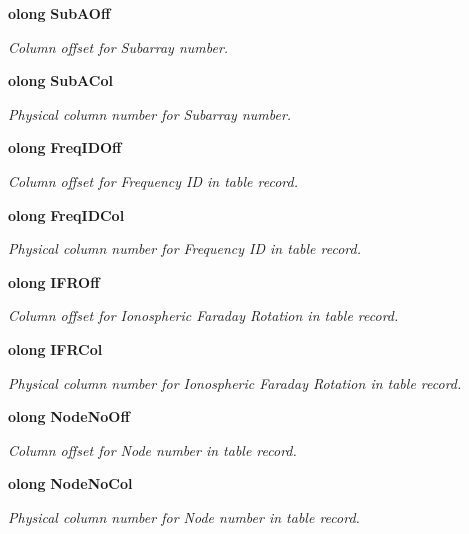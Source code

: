 \begin{CompactItemize}
{\bf olong} {\bf Sub\-AOff}
\begin{CompactList}\small\item\em Column offset for Subarray number. \item\end{CompactList}\item 
{\bf olong} {\bf Sub\-ACol}
\begin{CompactList}\small\item\em Physical column number for Subarray number. \item\end{CompactList}\item 
{\bf olong} {\bf Freq\-IDOff}
\begin{CompactList}\small\item\em Column offset for Frequency ID in table record. \item\end{CompactList}\item 
{\bf olong} {\bf Freq\-IDCol}
\begin{CompactList}\small\item\em Physical column number for Frequency ID in table record. \item\end{CompactList}\item 
{\bf olong} {\bf IFROff}
\begin{CompactList}\small\item\em Column offset for Ionospheric Faraday Rotation in table record. \item\end{CompactList}\item 
{\bf olong} {\bf IFRCol}
\begin{CompactList}\small\item\em Physical column number for Ionospheric Faraday Rotation in table record. \item\end{CompactList}\item 
{\bf olong} {\bf Node\-No\-Off}
\begin{CompactList}\small\item\em Column offset for Node number in table record. \item\end{CompactList}\item 
{\bf olong} {\bf Node\-No\-Col}
\begin{CompactList}\small\item\em Physical column number for Node number in table record. \item\end{CompactList}\item 

\end{CompactItemize}
